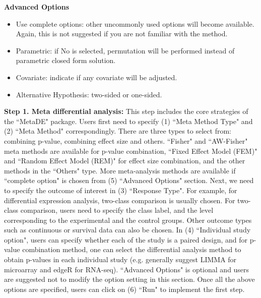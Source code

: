 \begin{steps}
\item \textbf{Advanced Options}
\begin{itemize}
\item Use complete options: other uncommonly used options will become available. Again, this is not suggested if you are not familiar with the method.
\item Parametric: if No is selected, permutation will be performed instead of parametric closed form solution.
\item Covariate: indicate if any covariate will be adjusted.
\item Alternative Hypothesis: two-sided or one-sided.
\end{itemize}


\end{steps}



\textbf{Step 1. Meta differential analysis:} This step includes the core strategies of the ``MetaDE" package. Users first need to specify (1) ``Meta Method Type" and (2) ``Meta Method" correspondingly. There are three types to select from: combining p-value, combining effect size and others. ``Fisher" and ``AW-Fisher" meta methods are available for p-value combination, ``Fixed Effect Model (FEM)" and ``Random Effect Model (REM)" for effect size combination, and the other methods in the ``Others" type. More meta-analysis methods are available if ``complete option" is chosen from (5) ``Advanced Options" section. Next, we need to specify the outcome of interest in (3) ``Response Type". For example, for differential expression analysis, two-class comparison is usually chosen. For two-class comparison, users need to specify the class label, and the level corresponding to the experimental and the control groups. Other outcome types such as continuous or survival data can also be chosen. In (4) ``Individual study option", users can specify whether each of the study is a paired design, and for p-value combination method, one can select the differential analysis method to obtain p-values in each individual study (e.g. generally suggest LIMMA for microarray and edgeR for RNA-seq). ``Advanced Options" is optional and users are suggested not to modify the option setting in this section. Once all the above options are specified, users can click on (6) ``Run" to implement the first step. \\~\\

